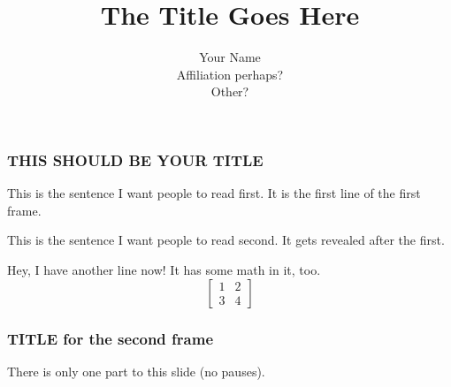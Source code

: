 \documentclass{beamer}  %
\title{The Title Goes Here}
\author{Your Name\\ Affiliation perhaps?\\Other?}
\date{\null}
\begin{document}
\begin{frame}
\maketitle
\vspace{-.5 in}
\end{frame}




\begin{frame} %
\frametitle{THIS SHOULD BE YOUR TITLE} %

\begin{center}
This is the sentence I want people to read first.  It is the first line of the first frame.
\end{center}

\pause  %


\begin{center}
This is the sentence I want people to read second.  It gets revealed after the first. %
\end{center}

\pause %

Hey, I have another line now!  It has some math in it, too.
$$\left[\begin{array}{cc}
1&2\\
3&4\end{array}\right]$$

\end{frame}  %


\begin{frame}  %
\frametitle{ TITLE for the second frame}

There is only one part to this slide (no pauses).

\end{frame}

\end{document}
